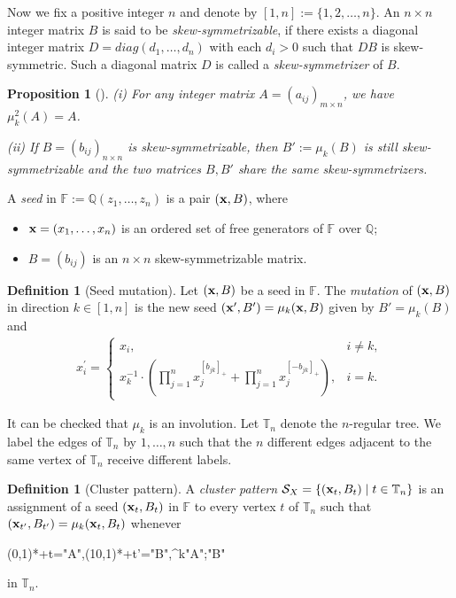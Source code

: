 \documentclass[10pt]{amsart}
\newtheorem{proposition}[theorem]{Proposition}
\theoremstyle{definition}
\newtheorem{definition}[theorem]{Definition}
\theoremstyle{remark}
\numberwithin{equation}{section}
\def\TT{\mathbb{T}}
\begin{document}
Now we fix a positive integer $n$ and denote by $[1,n]:=\{1,2,\ldots,n\}$. An $n\times n$ integer matrix $B$ is said to be {\em skew-symmetrizable}, if there exists a diagonal integer matrix $D=diag(d_1,\ldots,d_n)$ with each $d_i>0$ such that $DB$ is skew-symmetric. Such a diagonal matrix $D$ is called a {\em skew-symmetrizer} of $B$.

\begin{proposition}[{\cite{fz_2002}}]
 (i) For any integer matrix $A=(a_{ij})_{m\times n}$, we have $\mu_k^2(A)=A$.


 
 (ii) If $B=(b_{ij})_{n\times n}$ is skew-symmetrizable, then $B':=\mu_k(B)$ is still skew-symmetrizable and the two matrices $B, B'$ share the same skew-symmetrizers.
\end{proposition}



 A {\em seed}  in  $\mathbb F:=\mathbb Q(z_1,\ldots,z_n)$ is a pair $({\bf x},B)$, where
\begin{itemize}
    \item ${\bf x}=(x_1,\ldots,x_n)$ is an ordered set of free generators of $\mathbb F$ over $\mathbb Q$;
    \item $B=(b_{ij})$ is an $n\times n$ skew-symmetrizable matrix. 
\end{itemize}



\begin{definition}[Seed mutation]  Let $({\bf x},B)$ be a seed in $\mathbb F$. The {\em mutation}  of  $({\bf x},B)$ in direction $k\in[1,n]$ is the new seed  $({\bf x}', B')=\mu_k({\bf x}, B)$ given by $ B'=\mu_k(B)$ and
\begin{eqnarray}
\label{eqn:x-mutation}
 x_i^\prime=\begin{cases}x_i,&
 i\neq k,\\
 x_k^{-1}\cdot (\prod_{j=1}^nx_j^{[b_{jk}]_+}+\prod_{j=1}^nx_j^{[-b_{jk}]_+}),&i= k.\end{cases}\nonumber
\end{eqnarray}

\end{definition}
It can be checked that  $\mu_k$ is an involution. Let $\mathbb T_n$ denote the $n$-regular tree. We
 label the edges of $\mathbb T_n$ by $1,\ldots, n$ such that the $n$ different edges adjacent to the same vertex of $\mathbb T_n$ receive different labels.
 
\begin{definition}[Cluster pattern]  A {\em cluster pattern}  $\mathcal S_X=\{({\bf x}_t, B_t)\mid t\in \mathbb T_n\}$   is an assignment of a seed $({\bf x}_t,  B_t)$ in $\mathbb F$ to every vertex $t$ of $\mathbb T_n$ such that $({\bf x}_{t'}, B_{t'})=\mu_k({\bf x}_t,  B_t)$  whenever
	\begin{xy}(0,1)*+{t}="A",(10,1)*+{t'}="B",\ar@{-}^k"A";"B" \end{xy} in $\TT_n$. 
\end{definition}
\end{document}

